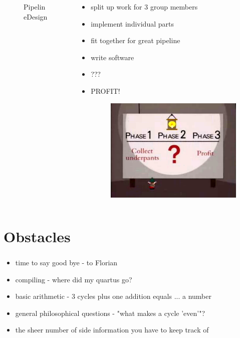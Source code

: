 \documentclass{beamer}
\begin{document}
\begin{frame}
\begin{columns}
\begin{column}{0.5\textwidth}
\begin{figure}
		\caption{PipelineDesign}
	\end{figure}
	\end{column}
	\begin{column}{0.5\textwidth}
		\begin{itemize}
			\item<2->split up work for 3 group members
			\item<3->implement individual parts
			\item<4->fit together for great pipeline
			\item<5->write software
			\item<6-> ???
			\item<7->PROFIT!
			\begin{figure}
				\includegraphics[height=0.3\textheight]{pics/Gnomes_plan.png}
			\end{figure}
		\end{itemize}
	\end{column}
	\end{columns}
\end{frame}

\section{Obstacles}
\begin{frame} %
	\frametitle{} %
  	\begin{itemize}
			\item time to say good bye \pause  - to Florian
			\pause
			\item compiling \pause - where did my quartus go?
			\pause
			\item basic arithmetic \pause- 3 cycles plus one addition equals ... a number
			\pause
			\item general philosophical questions \pause - "what makes a cycle 'even'"?
			\pause
			\item the sheer number of side information you have to keep track of
		\end{itemize}
\end{frame}
\end{document}
